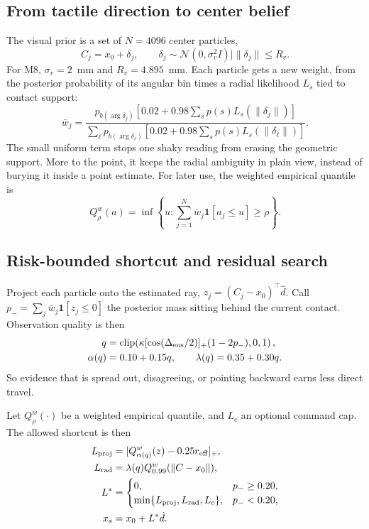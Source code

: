 \documentclass[letterpaper,10 pt,conference]{ieeeconf}
\newcommand{\ind}{\mathbf{1}}
\newcommand{\clip}{\operatorname{clip}}
\begin{document}
\subsection{From tactile direction to center belief}

The visual prior is a set of $N=4096$ center particles,
\begin{equation}
C_j=x_0+\delta_j,\qquad
\delta_j\sim\mathcal N(0,\sigma_v^2I)\mid\|\delta_j\|\le R_v .
\label{eq:center_samples}
\end{equation}
For M8, $\sigma_v=2$~mm and $R_v=4.895$~mm.  Each particle gets a new
weight, from the posterior probability of its angular bin times a radial
likelihood $L_s$ tied to contact support:
\begin{equation}
\bar w_j=\frac{p_{b(\arg\delta_j)}
\left[0.02+0.98\sum_s p(s)L_s(\|\delta_j\|)\right]}
{\sum_\ell p_{b(\arg\delta_\ell)}
\left[0.02+0.98\sum_s p(s)L_s(\|\delta_\ell\|)\right]}.
\label{eq:center_weights}
\end{equation}
The small uniform term stops one shaky reading from erasing the geometric
support.  More to the point, it keeps the radial ambiguity in plain view,
instead of burying it inside a point estimate.  For later use, the weighted
empirical quantile is
\begin{equation}
Q_\rho^w(a)=\inf\left\{u:\sum_{j=1}^{N}\bar w_j\ind[a_j\le u]\ge\rho\right\}.
\label{eq:weighted_quantile}
\end{equation}

\subsection{Risk-bounded shortcut and residual search}

Project each particle onto the estimated ray, $z_j=(C_j-x_0)^\top\hat d$.
Call $p_-=\sum_j\bar w_j\ind[z_j\le0]$ the posterior mass sitting behind
the current contact.  Observation quality is then
\begin{align}
q&=\clip\!\left(\kappa[\cos(\Delta_{\rm ens}/2)]_+(1-2p_-),0,1\right),
\nonumber\\
\alpha(q)&=0.10+0.15q,\qquad
\lambda(q)=0.35+0.30q .
\label{eq:shortcut_quality}
\end{align}
So evidence that is spread out, disagreeing, or pointing backward earns
less direct travel.

Let $Q_\rho^w(\cdot)$ be a weighted empirical quantile, and $L_c$ an
optional command cap.  The allowed shortcut is then
\begin{align}
L_{\rm proj}&=[Q_{\alpha(q)}^w(z)-0.25r_{\rm eff}]_+,
\nonumber\\
L_{\rm rad}&=\lambda(q)Q_{0.99}^w(\|C-x_0\|),
\nonumber\\
L^*&=
\begin{cases}
0,&p_-\ge0.20,\\
\min\{L_{\rm proj},L_{\rm rad},L_c\},&p_-<0.20,
\end{cases}
\nonumber\\
x_s&=x_0+L^*\hat d .
\label{eq:shortcut_length}
\end{align}
\end{document}
